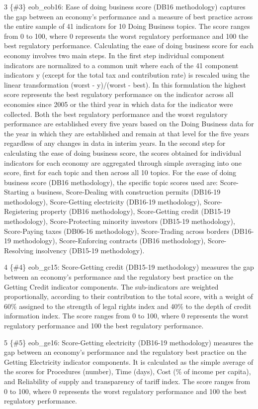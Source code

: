 \documentclass[
]{article}
\begin{document}
3 \{\#3\} eob\_eob16: Ease of doing business score (DB16 methodology)
captures the gap between an economy's performance and a measure of best
practice across the entire sample of 41 indicators for 10 Doing Business
topics. The score ranges from 0 to 100, where 0 represents the worst
regulatory performance and 100 the best regulatory performance.
Calculating the ease of doing business score for each economy involves
two main steps. In the first step individual component indicators are
normalized to a common unit where each of the 41 component indicators y
(except for the total tax and contribution rate) is rescaled using the
linear transformation (worst - y)/(worst - best). In this formulation
the highest score represents the best regulatory performance on the
indicator across all economies since 2005 or the third year in which
data for the indicator were collected. Both the best regulatory
performance and the worst regulatory performance are established every
five years based on the Doing Business data for the year in which they
are established and remain at that level for the five years regardless
of any changes in data in interim years. In the second step for
calculating the ease of doing business score, the scores obtained for
individual indicators for each economy are aggregated through simple
averaging into one score, first for each topic and then across all 10
topics. For the ease of doing business score (DB16 methodology), the
specific topic scores used are: Score-Starting a business, Score-Dealing
with construction permits (DB16-19 methodology), Score-Getting
electricity (DB16-19 methodology), Score-Registering property (DB16
methodology), Score-Getting credit (DB15-19 methodology),
Score-Protecting minority investors (DB15-19 methodology), Score-Paying
taxes (DB06-16 methodology), Score-Trading across borders (DB16-19
methodology), Score-Enforcing contracts (DB16 methodology),
Score-Resolving insolvency (DB15-19 methodology).

4 \{\#4\} eob\_gc15: Score-Getting credit (DB15-19 methodology) measures
the gap between an economy's performance and the regulatory best
practice on the Getting Credit indicator components. The sub-indicators
are weighted proportionally, according to their contribution to the
total score, with a weight of 60\% assigned to the strength of legal
rights index and 40\% to the depth of credit information index. The
score ranges from 0 to 100, where 0 represents the worst regulatory
performance and 100 the best regulatory performance.

5 \{\#5\} eob\_ge16: Score-Getting electricity (DB16-19 methodology)
measures the gap between an economy's performance and the regulatory
best practice on the Getting Electricity indicator components. It is
calculated as the simple average of the scores for Procedures (number),
Time (days), Cost (\% of income per capita), and Reliability of supply
and transparency of tariff index. The score ranges from 0 to 100, where
0 represents the worst regulatory performance and 100 the best
regulatory performance.
\end{document}
